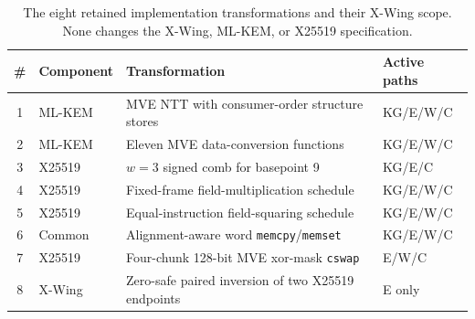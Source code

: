 \begin{table}[t]
\centering
\caption{The eight retained implementation transformations and their X-Wing scope. None changes the X-Wing, ML-KEM, or X25519 specification.}
\label{tab:transform-scope}
\footnotesize
\renewcommand{\arraystretch}{1.12}
\begin{tabularx}{\textwidth}{@{}cl>{\raggedright\arraybackslash}Xl@{}}
\toprule
\# & Component & Transformation & Active paths \\
\midrule
1 & ML-KEM & MVE NTT with consumer-order structure stores & KG/E/W/C \\
2 & ML-KEM & Eleven MVE data-conversion functions & KG/E/W/C \\
3 & X25519 & $w=3$ signed comb for basepoint 9 & KG/E/C \\
4 & X25519 & Fixed-frame field-multiplication schedule & KG/E/W/C \\
5 & X25519 & Equal-instruction field-squaring schedule & KG/E/W/C \\
6 & Common & Alignment-aware word \texttt{memcpy}/\texttt{memset} & KG/E/W/C \\
7 & X25519 & Four-chunk 128-bit MVE xor-mask \texttt{cswap} & E/W/C \\
8 & X-Wing & Zero-safe paired inversion of two X25519 endpoints & E only \\
\bottomrule
\end{tabularx}
\end{table}
